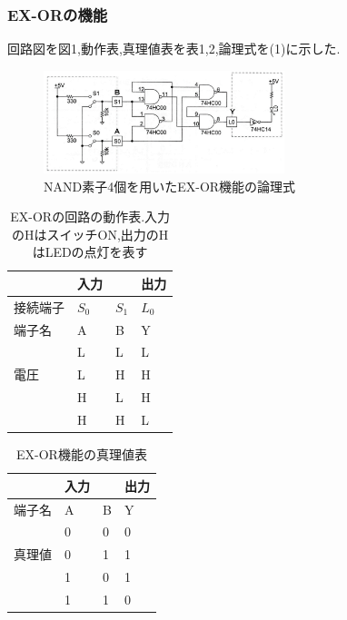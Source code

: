 \documentclass[twocolumn, 10pt,a4j]{jsarticle}
\begin{document}
  \subsubsection{EX-ORの機能}
    回路図を図1,動作表,真理値表を表1,2,論理式を(1)に示した.
    \begin{figure}[H]
      \begin{center}
        \includegraphics[width=7cm]{../img/ex_or/ex-or_kairo.png}
        \caption{NAND素子4個を用いたEX-OR機能の論理式}
      \end{center}
    \end{figure}
    \begin{table}[]
      \centering
      \caption{EX-ORの回路の動作表.入力のHはスイッチON,出力のHはLEDの点灯を表す}
      \label{my-label}
      \footnotesize
      \begin{tabular}{l|ll|l}
            & 入力                      &    & 出力 \\ \hline
        接続端子 & \multicolumn{1}{l|}{$S_{0}$} & $S_{1}$ & $L_{0}$ \\ \hline
        端子名  & \multicolumn{1}{l|}{A}  & B  & Y  \\ \hline
            & \multicolumn{1}{l|}{L}  & L  & L  \\
        電圧   & \multicolumn{1}{l|}{L}  & H  & H  \\
            & \multicolumn{1}{l|}{H}  & L  & H  \\
            & \multicolumn{1}{l|}{H}  & H  & L 
      \end{tabular}
    \end{table}
    \begin{table}[]
      \centering
      \caption{EX-OR機能の真理値表}
      \label{my-label}
      \footnotesize
      \begin{tabular}{l|ll|l}
            & 入力                     &   & 出力 \\ \hline
        端子名 & \multicolumn{1}{l|}{A} & B & Y  \\ \hline
            & \multicolumn{1}{l|}{0} & 0 & 0  \\
        真理値 & \multicolumn{1}{l|}{0} & 1 & 1  \\
            & \multicolumn{1}{l|}{1} & 0 & 1  \\
            & \multicolumn{1}{l|}{1} & 1 & 0 
      \end{tabular}
    \end{table}
    
\end{document}
